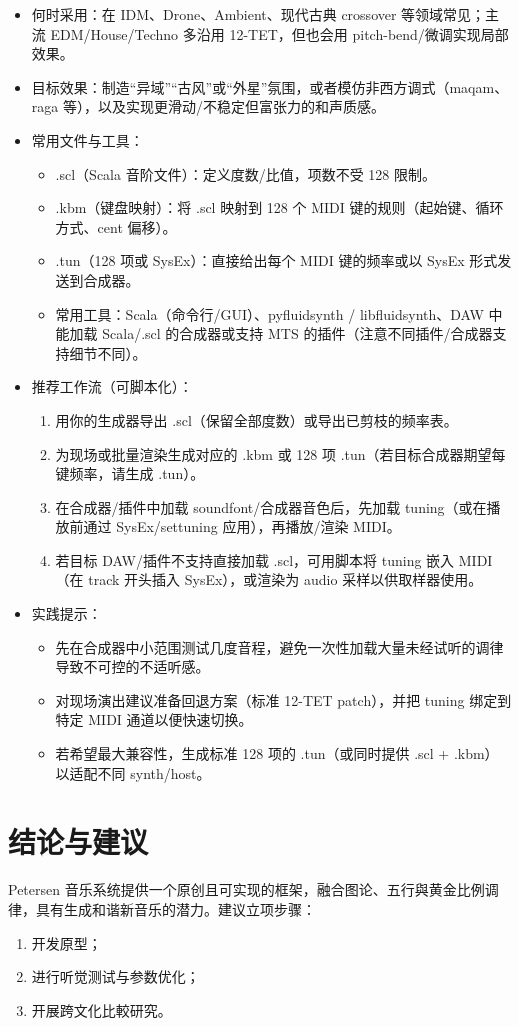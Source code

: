 \documentclass{article}
\begin{document}
\begin{itemize}
  \item 何时采用：在 IDM、Drone、Ambient、现代古典 crossover 等领域常见；主流 EDM/House/Techno 多沿用 12-TET，但也会用 pitch-bend/微调实现局部效果。
  \item 目标效果：制造“异域”“古风”或“外星”氛围，或者模仿非西方调式（maqam、raga 等），以及实现更滑动/不稳定但富张力的和声质感。
  \item 常用文件与工具：
    \begin{itemize}
      \item .scl（Scala 音阶文件）：定义度数/比值，项数不受 128 限制。
      \item .kbm（键盘映射）：将 .scl 映射到 128 个 MIDI 键的规则（起始键、循环方式、cent 偏移）。
      \item .tun（128 项或 SysEx）：直接给出每个 MIDI 键的频率或以 SysEx 形式发送到合成器。
      \item 常用工具：Scala（命令行/GUI）、pyfluidsynth / libfluidsynth、DAW 中能加载 Scala/.scl 的合成器或支持 MTS 的插件（注意不同插件/合成器支持细节不同）。
    \end{itemize}
  \item 推荐工作流（可脚本化）：
    \begin{enumerate}
      \item 用你的生成器导出 .scl（保留全部度数）或导出已剪枝的频率表。
      \item 为现场或批量渲染生成对应的 .kbm 或 128 项 .tun（若目标合成器期望每键频率，请生成 .tun）。
      \item 在合成器/插件中加载 soundfont/合成器音色后，先加载 tuning（或在播放前通过 SysEx/settuning 应用），再播放/渲染 MIDI。
      \item 若目标 DAW/插件不支持直接加载 .scl，可用脚本将 tuning 嵌入 MIDI（在 track 开头插入 SysEx），或渲染为 audio 采样以供取样器使用。
    \end{enumerate}
  \item 实践提示：
    \begin{itemize}
      \item 先在合成器中小范围测试几度音程，避免一次性加载大量未经试听的调律导致不可控的不适听感。
      \item 对现场演出建议准备回退方案（标准 12-TET patch），并把 tuning 绑定到特定 MIDI 通道以便快速切换。
      \item 若希望最大兼容性，生成标准 128 项的 .tun（或同时提供 .scl + .kbm）以适配不同 synth/host。
    \end{itemize}
\end{itemize}

\section{结论与建议}
Petersen 音乐系统提供一个原创且可实现的框架，融合图论、五行與黄金比例调律，具有生成和谐新音乐的潜力。建议立项步骤：
\begin{enumerate}
  \item 开发原型；
  \item 进行听觉测试与参数优化；
  \item 开展跨文化比較研究。
\end{enumerate}
\end{document}
